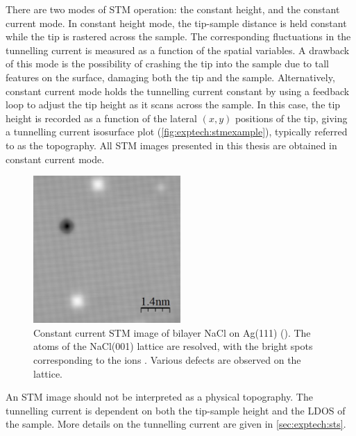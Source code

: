 There are two modes of \ac{STM} operation: the constant height, and the constant current mode. In constant height mode, the tip-sample distance is held constant while the tip is rastered across the sample. The corresponding fluctuations in the tunnelling current is measured as a function of the spatial variables. A drawback of this mode is the possibility of crashing the tip into the sample due to tall features on the surface, damaging both the tip and the sample. Alternatively, constant current mode holds the tunnelling current constant by using a feedback loop to adjust the tip height as it scans across the sample. In this case, the tip height is recorded as a function of the lateral $(x,y)$ positions of the tip, giving a tunnelling current isosurface plot (\autoref{fig:exptech:stmexample}), typically referred to as the topography. All \ac{STM} images presented in this thesis are obtained in constant current mode.

\begin{figure} [h]
    \centering
    \includegraphics[width=0.5\textwidth]{pictures/atomic_NaCl.jpg}
    \caption[Constant current STM image of bilayer NaCl on Ag(111) (). The atoms of the NaCl(001) lattice are resolved, with the bright spots corresponding to the  ions. Various defects are observed on the lattice.]{Constant current STM image of bilayer NaCl on Ag(111) (). The atoms of the NaCl(001) lattice are resolved, with the bright spots corresponding to the  ions \citep{heidorn2013influence}. Various defects are observed on the lattice.}
    \label{fig:exptech:stmexample}
\end{figure}

An \ac{STM} image should not be interpreted as a physical topography. The tunnelling current is dependent on both the tip-sample height and the \ac{LDOS} of the sample. More details on the tunnelling current are given in \autoref{sec:exptech:sts}.




